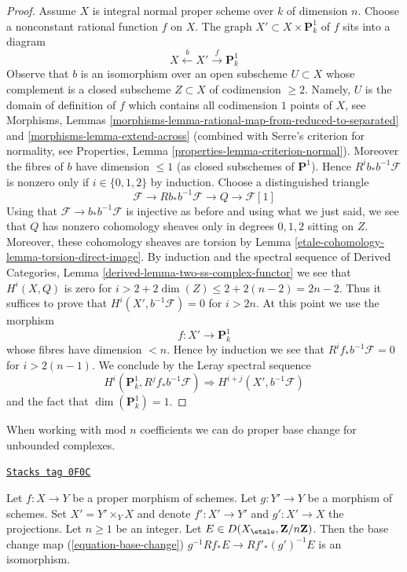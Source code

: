 \begin{proof}
\medskip\noindent
Assume $X$ is integral normal proper scheme over $k$ of dimension $n$.
Choose a nonconstant rational function $f$ on $X$. The graph
$X' \subset X \times \mathbf{P}^1_k$ of $f$ sits into a diagram
$$
X \xleftarrow{b} X' \xrightarrow{f} \mathbf{P}^1_k
$$
Observe that $b$ is an isomorphism over an open subscheme
$U \subset X$ whose complement is a closed subscheme
$Z \subset X$ of codimension $\geq 2$. Namely, $U$ is the
domain of definition of $f$ which contains all codimension $1$
points of $X$, see
Morphisms, Lemmas \ref{morphisms-lemma-rational-map-from-reduced-to-separated}
and \ref{morphisms-lemma-extend-across}
(combined with Serre's criterion for normality, see
Properties, Lemma \ref{properties-lemma-criterion-normal}).
Moreover the fibres of $b$ have dimension $\leq 1$ (as closed subschemes
of $\mathbf{P}^1$). Hence $R^ib_*b^{-1}\mathcal{F}$ is nonzero only
if $i \in \{0, 1, 2\}$ by induction. Choose a distinguished triangle
$$
\mathcal{F} \to Rb_*b^{-1}\mathcal{F} \to Q \to \mathcal{F}[1]
$$
Using that $\mathcal{F} \to b_*b^{-1}\mathcal{F}$ is injective
as before and using what we just said, we see that $Q$ has nonzero
cohomology sheaves only in degrees $0, 1, 2$ sitting on $Z$.
Moreover, these cohomology sheaves are torsion by
Lemma \ref{etale-cohomology-lemma-torsion-direct-image}.
By induction and the spectral sequence of
Derived Categories, Lemma \ref{derived-lemma-two-ss-complex-functor}
we see that $H^i(X, Q)$ is zero for
$i > 2 + 2\dim(Z) \leq 2 + 2(n - 2) = 2n - 2$. Thus it suffices
to prove that $H^i(X', b^{-1}\mathcal{F}) = 0$ for
$i > 2n$. At this point we use the morphism
$$
f : X' \to \mathbf{P}^1_k
$$
whose fibres have dimension $< n$. Hence by induction we see that
$R^if_*b^{-1}\mathcal{F} = 0$ for $i > 2(n - 1)$.
We conclude by the Leray spectral sequence
$$
H^i(\mathbf{P}^1_k, R^jf_*b^{-1}\mathcal{F})
\Rightarrow
H^{i + j}(X', b^{-1}\mathcal{F})
$$
and the fact that $\dim(\mathbf{P}^1_k) = 1$.
\end{proof}

When working with mod $n$ coefficients we can do proper
base change for unbounded complexes.

\begin{lemma}
\label{etale-cohomology-lemma-proper-base-change-mod-n}
\href{https://stacks.math.columbia.edu/tag/0F0C}{\texttt{Stacks tag 0F0C}}

Let $f : X \to Y$ be a proper morphism of schemes. Let $g : Y' \to Y$ be
a morphism of schemes. Set $X' = Y' \times_Y X$ and denote
$f' : X' \to Y'$ and $g' : X' \to X$ the projections.
Let $n \geq 1$ be an integer.
Let $E \in D(X_\etale, \mathbf{Z}/n\mathbf{Z})$.
Then the base change map (\ref{equation-base-change})
$g^{-1}Rf_*E \to Rf'_*(g')^{-1}E$
is an isomorphism.
\end{lemma}

